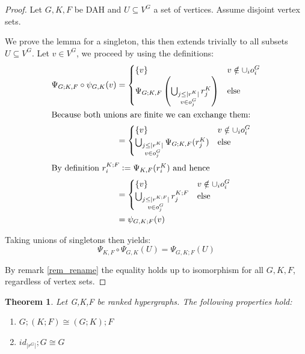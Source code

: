 \documentclass[12pt]{article}
\newtheorem{theorem}{Theorem}[section]
\theoremstyle{definition}
\newcommand{\defeq}{\vcentcolon=}
\newcommand{\1}{\mathbbm{1}}
\newcommand{\seq}{;}
\begin{document}
\begin{proof}
Let $G,K,F$ be DAH and $U\subseteq V^G$ a set of vertices. Assume disjoint vertex sets. 

We prove the lemma for a singleton, this then extends trivially to all subsets $U\subseteq V^G$. Let $v\in V^G$, we proceed by using the definitions:
    \begin{align*}
        \Psi_{G;K, F}\circ \psi_{G, K}(v) &= 
        \begin{cases}
            \{v\} & v\notin \cup_i o_i^G\\
            \Psi_{G;K, F}\left(\bigcup_{\substack{j \leq |r^K| \\ v \in o^G_j}} r^K_j\right) & \text{else}
        \end{cases}\\
        \intertext{Because both unions are finite we can exchange them: }
        &= 
        \begin{cases}
            \{v\} & v\notin \cup_i o_i^G\\
            \bigcup_{\substack{j \leq |r^K| \\ v \in o^G_j}} \Psi_{G;K, F} (r^K_j) & \text{else}\\
        \end{cases}\\
        \intertext{By definition $r^{K\seq F}_i \defeq \Psi_{K, F} (r^K_i)$ and hence}
        &=
        \begin{cases}
            \{v\} & v\notin \cup_i o_i^G\\
            \bigcup_{\substack{j\leq  |r^{K\seq F}| \\ v \in o^G_j}} r^{K\seq F}_j & \text{else}\\
        \end{cases}\\
        &= \psi_{G, K;F}(v)
    \end{align*}

    Taking unions of singletons then yields:
    \[
        \Psi_{K,F}\circ \Psi_{G, K}(U) = \Psi_{G,K;F}(U)
    \]

    By remark \ref{rem_rename} the equality holds up to isomorphism for all $G,K,F$, regardless of vertex sets.
\end{proof}

\begin{theorem}\label{thm:assoc}
Let G,K,F be ranked hypergraphs. The following properties hold:
    \begin{enumerate}
        \item $G\seq(K\seq F) \cong (G\seq K) \seq F$
        \item $id_{|r^G|} \seq G \cong G$
    \end{enumerate}
\end{theorem} %
\end{document}
